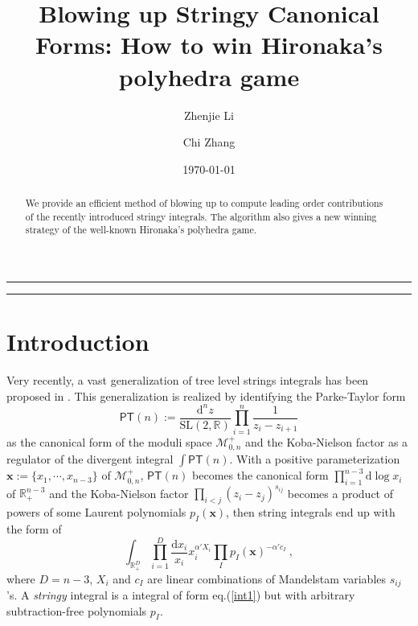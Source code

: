 \documentclass[12pt]{article}
\date{\today}
\title{Blowing up Stringy Canonical Forms: How to win Hironaka's polyhedra game}
\author{Zhenjie Li\and Chi Zhang}
\theoremstyle{definition}
\theoremstyle{plain}
\newcommand{\dif}{\mathrm{d}} %
\begin{document}
\maketitle

\begin{abstract}
We provide an efficient method of blowing up to compute leading order contributions of the recently introduced stringy integrals. The algorithm also gives a new winning strategy of the well-known Hironaka's polyhedra game.
\end{abstract}
\newpage

\begin{center}
	\rule{1.0\textwidth}{1pt}
\end{center}
\tableofcontents

\bigskip
\begin{center}
	\rule{1.0\textwidth}{1pt}
\end{center}


\section{Introduction}

Very recently, a vast generalization of tree level strings integrals has been proposed in \cite{Arkani-Hamed:2019mrd}. This generalization is realized by identifying the Parke-Taylor form 
\[
	\mathsf{PT}(n):=\frac{\dif^{n}z}{\mathrm{SL}(2,\mathbb{R})} \prod_{i=1}^{n}\frac{1}{z_{i}-z_{i+1}}
\]
as the canonical form of the moduli space $\mathcal{M}_{0,n}^{+}$ and the Koba-Nielson factor as a regulator of the divergent integral $\int \mathsf{PT}(n)$. With a positive parameterization  $\mathbf{x}:= \{x_{1},\cdots, x_{n-3}\}$  of $\mathcal{M}_{0,n}^{+}$, $\mathsf{PT}(n)$ becomes the canonical form $\prod_{i=1}^{n-3} \dif \log x_{i}$ of $\mathbb{R}_{+}^{n-3}$ and the Koba-Nielson factor $\prod_{i<j} (z_{i}-z_{j})^{s_{ij}}$ becomes a product of powers of some Laurent polynomials $p_{I}(\mathbf{x})$, then string integrals end up with the form of
\begin{equation} 
	\int_{\mathbb{R}_{+}^{D}} \prod_{i=1}^{D}\frac{\dif x_{i}}{x_{i}}x_{i}^{\alpha' X_{i}}\prod_{I}p_{I}(\mathbf{x})^{-\alpha'c_{I}}	\:, \label{int1}
\end{equation}
where $D=n{-}3$, $X_{i}$ and $c_{I}$ are linear combinations of Mandelstam variables $s_{ij}$'s. A \emph{stringy} integral is a integral of form eq.(\ref{int1}) but with arbitrary subtraction-free polynomials $p_{I}$. 
\end{document}
